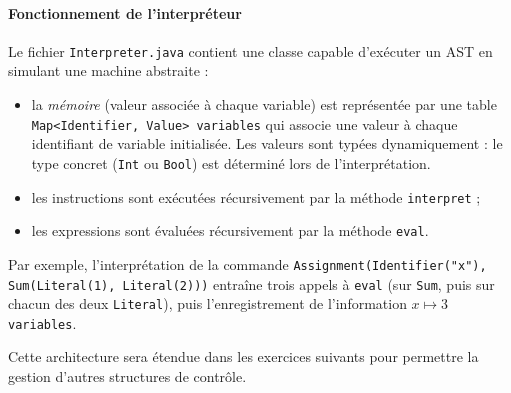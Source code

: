 \documentclass[correction]{td}
\begin{document}
\begin{exercice}
  \begin{center}
  \end{center}

  \paragraph{Fonctionnement de l'interpréteur}

  Le fichier \lstinline|Interpreter.java| contient une classe capable d'exécuter
  un AST en simulant une machine abstraite :

  \begin{itemize}
  \item la \emph{mémoire} (valeur associée à chaque variable)
    est représentée par une table \lstinline|Map<Identifier, Value> variables|
    qui associe une valeur à chaque identifiant de variable initialisée.
    Les valeurs sont typées dynamiquement : le type concret (\lstinline|Int| ou \lstinline|Bool|)
    est déterminé lors de l'interprétation.
  \item les instructions sont exécutées récursivement par
    la méthode \lstinline|interpret| ;
  \item les expressions sont évaluées récursivement par la méthode
    \lstinline|eval|.
  \end{itemize}

  Par exemple, l'interprétation de la commande
  \lstinline|Assignment(Identifier("x"), Sum(Literal(1), Literal(2)))|
  entraîne trois appels à \lstinline|eval| (sur \lstinline|Sum|, puis sur
  chacun des deux \lstinline|Literal|), puis l'enregistrement de l'information  $x \mapsto 3$
  \lstinline|variables|.

  Cette architecture sera étendue dans les exercices suivants pour permettre
  la gestion d'autres structures de contrôle.


\end{exercice}
\end{document}
